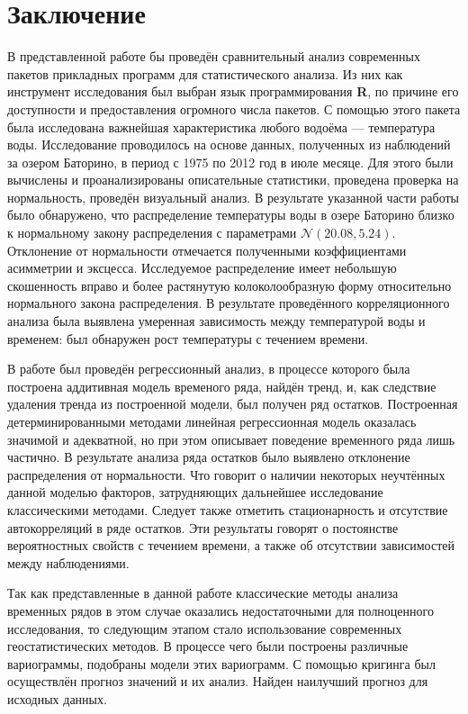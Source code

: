 
\chapter*{Заключение}

В представленной работе бы проведён сравнительный анализ современных пакетов прикладных программ для статистического анализа. Из них как инструмент исследования был выбран язык программирования \textbf{R}, по причине его доступности и предоставления огромного числа пакетов. С помощью этого пакета была исследована важнейшая характеристика любого водоёма --- температура воды. Исследование проводилось на основе данных, полученных из наблюдений за озером Баторино, в период с 1975 по 2012 год в июле месяце. Для этого были вычислены и проанализированы описательные статистики, проведена проверка на нормальность, проведён визуальный анализ. В результате указанной части работы было обнаружено, что распределение температуры воды в озере Баторино близко к нормальному закону распределения с параметрами $\mathcal{N}(20.08, 5.24)$. Отклонение от нормальности отмечается полученными коэффициентами асимметрии и эксцесса. Исследуемое распределение имеет небольшую скошенность вправо и более растянутую колоколообразную форму относительно нормального закона распределения. В результате проведённого корреляционного анализа была выявлена умеренная зависимость между температурой воды и временем: был обнаружен рост температуры с течением времени.

В работе был проведён регрессионный анализ, в процессе которого была построена аддитивная модель временого ряда, найдён тренд, и, как следствие удаления тренда из построенной модели, был получен ряд остатков. Построенная детерминированными методами линейная регрессионная модель оказалась значимой и адекватной, но при этом описывает поведение временного ряда лишь частично. В результате анализа ряда остатков было выявлено отклонение распределения от нормальности. Что говорит о наличии некоторых неучтённых данной моделью факторов, затрудняющих дальнейшее исследование классическими методами. Следует также отметить стационарность и отсутствие автокорреляций в ряде остатков. Эти результаты говорят о постоянстве вероятностных свойств с течением времени, а также об отсутствии зависимостей между наблюдениями.

Так как представленные в данной работе классические методы анализа временных рядов в этом случае оказались недостаточными для полноценного исследования, то следующим этапом стало использование современных геостатистических методов. В процессе чего были построены различные вариограммы, подобраны модели этих вариограмм. С помощью кригинга был осуществлён прогноз значений и их анализ. Найден наилучший прогноз для исходных данных.